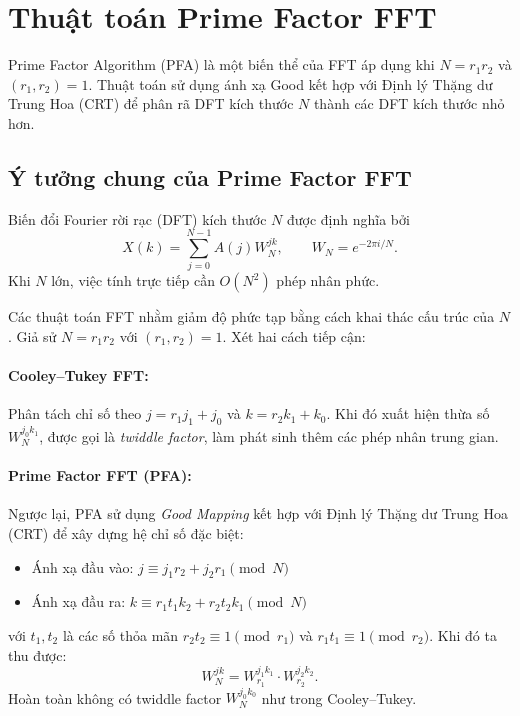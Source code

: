 \section{Thuật toán Prime Factor FFT}

Prime Factor Algorithm (PFA) là một biến thể của FFT áp dụng khi \(N = r_1 r_2\) và \((r_1, r_2) = 1\). Thuật toán sử dụng ánh xạ Good kết hợp với Định lý Thặng dư Trung Hoa (CRT) để phân rã DFT kích thước \(N\) thành các DFT kích thước nhỏ hơn.

\subsection{Ý tưởng chung của Prime Factor FFT}

Biến đổi Fourier rời rạc (DFT) kích thước $N$ được định nghĩa bởi
\begin{equation}
X(k)=\sum_{j=0}^{N-1}A(j)W_N^{jk}, \qquad W_N=e^{-2\pi i/N}.
\end{equation}
Khi $N$ lớn, việc tính trực tiếp cần $O(N^2)$ phép nhân phức.

Các thuật toán FFT nhằm giảm độ phức tạp bằng cách khai thác cấu trúc của $N$. 
Giả sử $N = r_1 r_2$ với $(r_1,r_2)=1$. Xét hai cách tiếp cận:

\paragraph{Cooley--Tukey FFT:}
Phân tách chỉ số theo $j = r_1 j_1 + j_0$ và $k = r_2 k_1 + k_0$. Khi đó xuất hiện thừa số $W_N^{j_0 k_1}$, được gọi là \textit{twiddle factor}, làm phát sinh thêm các phép nhân trung gian.

\paragraph{Prime Factor FFT (PFA):}
Ngược lại, PFA sử dụng \textit{Good Mapping} kết hợp với Định lý Thặng dư Trung Hoa (CRT) để xây dựng hệ chỉ số đặc biệt:
\begin{itemize}
    \item Ánh xạ đầu vào: $j \equiv j_1 r_2 + j_2 r_1 \pmod{N}$
    \item Ánh xạ đầu ra: $k \equiv r_1 t_1 k_2 + r_2 t_2 k_1 \pmod{N}$
\end{itemize}
với $t_1, t_2$ là các số thỏa mãn $r_2 t_2 \equiv 1 \pmod{r_1}$ và $r_1 t_1 \equiv 1 \pmod{r_2}$. 
Khi đó ta thu được:
\begin{equation}
W_N^{jk} = W_{r_1}^{j_1 k_1} \cdot W_{r_2}^{j_2 k_2}.
\end{equation}
Hoàn toàn không có twiddle factor $W_N^{j_0 k_0}$ như trong Cooley--Tukey.


